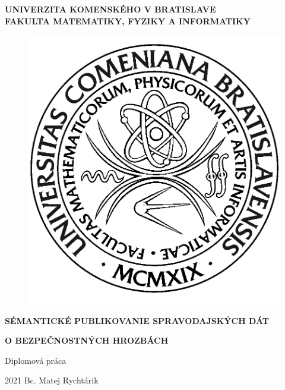 \documentclass[12pt, a4paper, oneside]{book}
\newcommand\mftitle{Sémantické publikovanie spravodajských dát}
\newcommand\mftitlen{o bezpečnostných hrozbách}
\newcommand\mfthesistype{Diplomová práca}
\newcommand\mfauthor{Bc. Matej Rychtárik}
\newcommand\mfuniversity{UNIVERZITA KOMENSKÉHO V BRATISLAVE}
\newcommand\mffaculty{FAKULTA MATEMATIKY, FYZIKY A INFORMATIKY}
\begin{document}
\frontmatter

\thispagestyle{empty}

\noindent
\begin{minipage}{\textwidth}
\begin{center}
\textbf{\mfuniversity \\
\mffaculty}
\end{center}
\end{minipage}

\vfill
\begin{figure}[!hbt]
	\begin{center}
		\includegraphics{images/logo_fmph}
		\label{img:logo}
	\end{center}
\end{figure}
\begin{center}
	\begin{minipage}{0.8\textwidth}
		\centerline{\textbf{\large\MakeUppercase{\mftitle}}}
		\centerline{\textbf{\large\MakeUppercase{\mftitlen}}}
		\smallskip
		\centerline{\mfthesistype}
	\end{minipage}
\end{center}
\vfill
2021 \hfill
\mfauthor
\eject 

\thispagestyle{empty}
\end{document}

